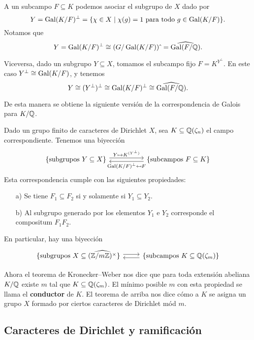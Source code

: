 A un subcampo $F\subseteq K$ podemos asociar el subgrupo de $X$ dado por
$$Y = \operatorname{Gal} (K/F)^\perp = \{ \chi \in X \mid \chi (g) = 1 \text{ para todo } g \in \operatorname{Gal} (K/F) \}.$$
Notamos que
$$Y = \operatorname{Gal} (K/F)^\perp \cong (G/\operatorname{Gal} (K/F)){\hat{~}} = \widehat{\operatorname{Gal} (F/\mathbb{Q})}.$$

Viceversa, dado un subgrupo $Y \subseteq X$, tomamos el subcampo fijo
$F = K^{Y^\perp}$. En este caso $Y^\perp \cong \operatorname{Gal} (K/F)$, y tenemos
$$Y \cong (Y^\perp)^\perp \cong \operatorname{Gal} (K/F)^\perp \cong \widehat{\operatorname{Gal} (F/\mathbb{Q})}.$$

De esta manera se obtiene la siguiente versión de la correspondencia de Galois
para $K/\mathbb{Q}$.

\begin{teorema}
  Dado un grupo finito de caracteres de Dirichlet $X$, sea
  $K \subseteq \mathbb{Q} (\zeta_n)$ el campo correspondiente. Tenemos una biyección
  \[ \begin{tikzcd}[column sep=5em]
    \{ \text{subgrupos }Y \subseteq X \} \ar[shift left=0.25em]{r}{Y \mapsto K^{(Y^\perp)}} &
    \{ \text{subcampos }F \subseteq K \} \ar[shift left=0.25em]{l}{\Gal (K/F)^\perp \mapsfrom F}
  \end{tikzcd} \]
  Esta correspondencia cumple con las siguientes propiedades:
  \begin{enumerate}
  \item[a)] Se tiene $F_1 \subseteq F_2$ si y solamente si $Y_1 \subseteq Y_2$.

  \item[b)] Al subgrupo generado por los elementos $Y_1$ e $Y_2$ corresponde
    el compositum $F_1 F_2$.
  \end{enumerate}

  En particular, hay una biyección
  \[ \begin{tikzcd}
    \{ \text{subgrupos }X \subseteq \widehat{(\ZZ/m\ZZ)^\times} \} \ar[shift left=0.25em]{r} &
    \{ \text{subcampos }K \subseteq \QQ (\zeta_m) \} \ar[shift left=0.25em]{l}
  \end{tikzcd} \]
\end{teorema}

Ahora el teorema de Kronecker--Weber nos dice que para toda extensión abeliana
$K/\mathbb{Q}$ existe $m$ tal que $K \subseteq \mathbb{Q} (\zeta_m)$. El mínimo posible $m$
con esta propiedad se llama el \textbf{conductor} de $K$. El teorema de arriba
nos dice cómo a $K$ se asigna un grupo $X$ formado por ciertos caracteres
de Dirichlet mód $m$.

\subsection{Caracteres de Dirichlet y ramificación}

